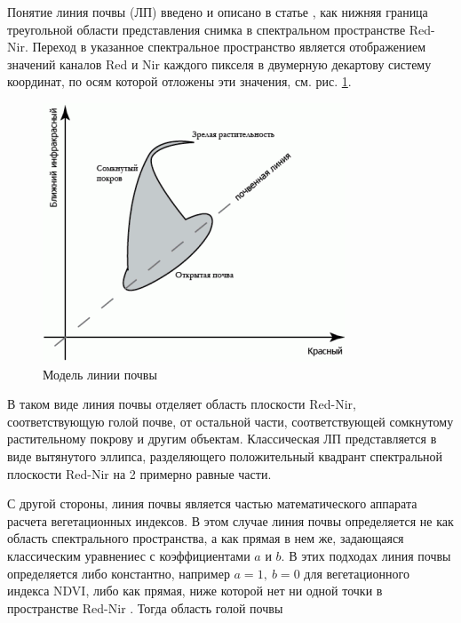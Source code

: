 \documentclass[14pt]{extarticle}
\begin{document}
\par
Понятие линия почвы (ЛП) введено и описано в статье \cite{soil-line-4}, как нижняя граница
треугольной области представления снимка в спектральном пространстве Red-Nir.
Переход в указанное спектральное пространство является отображением значений каналов Red и Nir
каждого пикселя в двумерную декартову систему координат, по осям которой отложены эти значения,
см. рис. \ref{image:soil_line_model}.
\begin{figure}[H]
\centering
\includegraphics[width=\linewidth]{imgs/soil_line_model.png}
\caption{Модель линии почвы}
\label{image:soil_line_model}
\end{figure}
\par
В таком виде линия почвы отделяет область плоскости Red-Nir, соответствующую голой почве, от
остальной части, соответствующей сомкнутому растительному покрову и другим объектам.
Классическая ЛП представляется в виде вытянутого эллипса, разделяющего положительный квадрант
спектральной плоскости Red-Nir на 2 примерно равные части.
\par
С другой стороны, линия почвы является частью математического аппарата расчета
вегетационных индексов. В этом случае линия почвы определяется не как область спектрального
пространства, а как прямая в нем же, задающаяся классическим уравнениес с коэффициентами
$a$ и $b$. В этих подходах линия почвы определяется либо константно, например 
$a=1,\ b=0$ для вегетационного индекса NDVI, либо как прямая, ниже которой нет ни 
одной точки в пространстве Red-Nir \cite{soil-line-5}. Тогда область голой почвы
\end{document}
